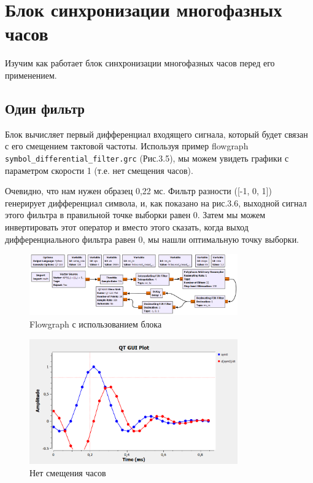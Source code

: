 \documentclass[a4paper,12pt]{report}
\begin{document}
\section{Блок синхронизации многофазных часов}
    Изучим как работает блок синхронизации многофазных часов перед его применением.
    
\subsection{Один фильтр}        
    Блок вычисляет первый дифференциал входящего сигнала, который будет связан с его смещением тактовой частоты. Используя пример flowgraph \texttt{symbol\_differential\_filter.grc} (Рис.3.5), мы можем увидеть графики с параметром скорости 1 (т.е. нет смещения часов).
    
    Очевидно, что нам нужен образец 0,22 мс. Фильтр разности ([-1, 0, 1]) генерирует дифференциал символа, и, как показано на рис.3.6, выходной сигнал этого фильтра в правильной точке выборки равен 0. Затем мы можем инвертировать этот оператор и вместо этого сказать, когда выход дифференциального фильтра равен 0, мы нашли оптимальную точку выборки.
\begin{figure}[H]
        \centering
        \includegraphics[width=0.8\textwidth]{fig3-5.PNG}
        \caption{Flowgraph с использованием блока}
        \label{fig:fig3-5}
\end{figure}
\begin{figure}[H]
        \centering
        \includegraphics[width=0.8\textwidth]{fig3-6.PNG}
        \caption{Нет смещения часов}
        \label{fig:fig3-6}
\end{figure}
    
\end{document}
